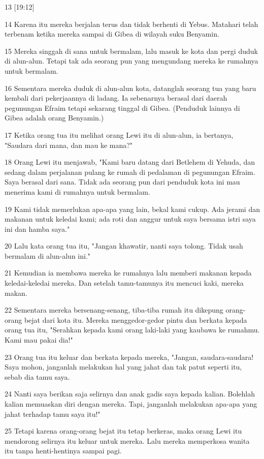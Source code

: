 \par 13 [19:12]
\par 14 Karena itu mereka berjalan terus dan tidak berhenti di Yebus. Matahari telah terbenam ketika mereka sampai di Gibea di wilayah suku Benyamin.
\par 15 Mereka singgah di sana untuk bermalam, lalu masuk ke kota dan pergi duduk di alun-alun. Tetapi tak ada seorang pun yang mengundang mereka ke rumahnya untuk bermalam.
\par 16 Sementara mereka duduk di alun-alun kota, datanglah seorang tua yang baru kembali dari pekerjaannya di ladang. Ia sebenarnya berasal dari daerah pegunungan Efraim tetapi sekarang tinggal di Gibea. (Penduduk lainnya di Gibea adalah orang Benyamin.)
\par 17 Ketika orang tua itu melihat orang Lewi itu di alun-alun, ia bertanya, "Saudara dari mana, dan mau ke mana?"
\par 18 Orang Lewi itu menjawab, "Kami baru datang dari Betlehem di Yehuda, dan sedang dalam perjalanan pulang ke rumah di pedalaman di pegunungan Efraim. Saya berasal dari sana. Tidak ada seorang pun dari penduduk kota ini mau menerima kami di rumahnya untuk bermalam.
\par 19 Kami tidak memerlukan apa-apa yang lain, bekal kami cukup. Ada jerami dan makanan untuk keledai kami; ada roti dan anggur untuk saya bersama istri saya ini dan hamba saya."
\par 20 Lalu kata orang tua itu, "Jangan khawatir, nanti saya tolong. Tidak usah bermalam di alun-alun ini."
\par 21 Kemudian ia membawa mereka ke rumahnya lalu memberi makanan kepada keledai-keledai mereka. Dan setelah tamu-tamunya itu mencuci kaki, mereka makan.
\par 22 Sementara mereka bersenang-senang, tiba-tiba rumah itu dikepung orang-orang bejat dari kota itu. Mereka menggedor-gedor pintu dan berkata kepada orang tua itu, "Serahkan kepada kami orang laki-laki yang kaubawa ke rumahmu. Kami mau pakai dia!"
\par 23 Orang tua itu keluar dan berkata kepada mereka, "Jangan, saudara-saudara! Saya mohon, janganlah melakukan hal yang jahat dan tak patut seperti itu, sebab dia tamu saya.
\par 24 Nanti saya berikan saja selirnya dan anak gadis saya kepada kalian. Bolehlah kalian memuaskan diri dengan mereka. Tapi, janganlah melakukan apa-apa yang jahat terhadap tamu saya itu!"
\par 25 Tetapi karena orang-orang bejat itu tetap berkeras, maka orang Lewi itu mendorong selirnya itu keluar untuk mereka. Lalu mereka memperkosa wanita itu tanpa henti-hentinya sampai pagi.
